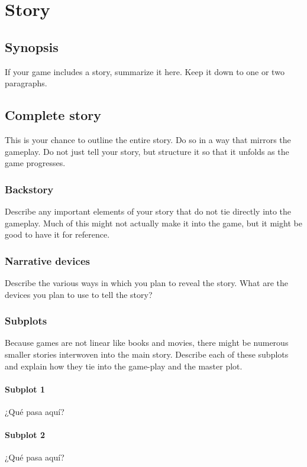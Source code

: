\chapter{Story}
\section{Synopsis} %
If your game includes a story, summarize it here. Keep it down to one or two paragraphs.

\section{Complete story}%
This is your chance to outline the entire story. Do so in a way that mirrors the gameplay. Do not just tell your story, but structure it so that it unfolds as the game progresses.

\subsection{Backstory}%
Describe any important elements of your story that do not tie directly into the gameplay. Much of this might not actually make it into the game, but it might be good to have it for reference.

\subsection{Narrative devices}%
Describe the various ways in which you plan to reveal the story. What are the devices you plan to use to tell the story?

\subsection{Subplots}%
Because games are not linear like books and movies, there might be numerous smaller stories interwoven into the main story. Describe each of these subplots and explain how they tie into the game-play and the master plot.

\subsubsection{Subplot 1}%
¿Qué pasa aquí?
\subsubsection{Subplot 2}%
¿Qué pasa aquí?